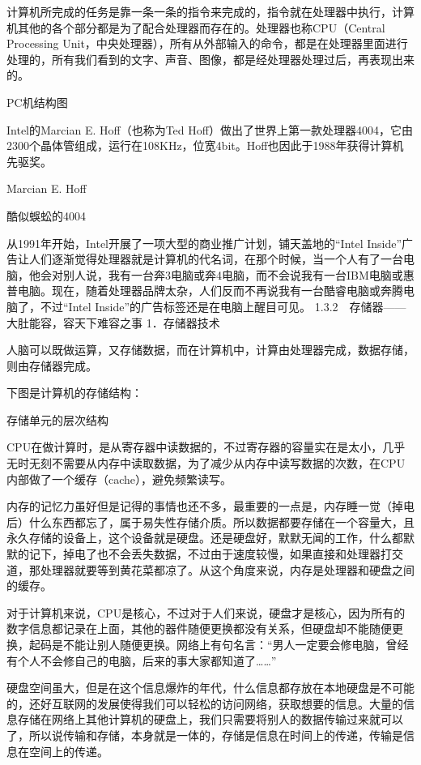 \documentclass[12pt,UTF8]{ctexbook}
\begin{document}
计算机所完成的任务是靠一条一条的指令来完成的，指令就在处理器中执行，计算机其他的各个部分都是为了配合处理器而存在的。处理器也称CPU（Central Processing Unit，中央处理器），所有从外部输入的命令，都是在处理器里面进行处理的，所有我们看到的文字、声音、图像，都是经处理器处理过后，再表现出来的。

PC机结构图

Intel的Marcian E. Hoff（也称为Ted Hoff）做出了世界上第一款处理器4004，它由2300个晶体管组成，运行在108KHz，位宽4bit。Hoff也因此于1988年获得计算机先驱奖。

Marcian E. Hoff

酷似蜈蚣的4004

从1991年开始，Intel开展了一项大型的商业推广计划，铺天盖地的“Intel Inside”广告让人们逐渐觉得处理器就是计算机的代名词，在那个时候，当一个人有了一台电脑，他会对别人说，我有一台奔3电脑或奔4电脑，而不会说我有一台IBM电脑或惠普电脑。现在，随着处理器品牌太杂，人们反而不再说我有一台酷睿电脑或奔腾电脑了，不过“Intel Inside”的广告标签还是在电脑上醒目可见。
1.3.2　存储器——大肚能容，容天下难容之事
1．存储器技术

人脑可以既做运算，又存储数据，而在计算机中，计算由处理器完成，数据存储，则由存储器完成。

下图是计算机的存储结构：

存储单元的层次结构

CPU在做计算时，是从寄存器中读数据的，不过寄存器的容量实在是太小，几乎无时无刻不需要从内存中读取数据，为了减少从内存中读写数据的次数，在CPU内部做了一个缓存（cache），避免频繁读写。

内存的记忆力虽好但是记得的事情也还不多，最重要的一点是，内存睡一觉（掉电后）什么东西都忘了，属于易失性存储介质。所以数据都要存储在一个容量大，且永久存储的设备上，这个设备就是硬盘。还是硬盘好，默默无闻的工作，什么都默默的记下，掉电了也不会丢失数据，不过由于速度较慢，如果直接和处理器打交道，那处理器就要等到黄花菜都凉了。从这个角度来说，内存是处理器和硬盘之间的缓存。

对于计算机来说，CPU是核心，不过对于人们来说，硬盘才是核心，因为所有的数字信息都记录在上面，其他的器件随便更换都没有关系，但硬盘却不能随便更换，起码是不能让别人随便更换。网络上有句名言：“男人一定要会修电脑，曾经有个人不会修自己的电脑，后来的事大家都知道了……”

硬盘空间虽大，但是在这个信息爆炸的年代，什么信息都存放在本地硬盘是不可能的，还好互联网的发展使得我们可以轻松的访问网络，获取想要的信息。大量的信息存储在网络上其他计算机的硬盘上，我们只需要将别人的数据传输过来就可以了，所以说传输和存储，本身就是一体的，存储是信息在时间上的传递，传输是信息在空间上的传递。
\end{document}
